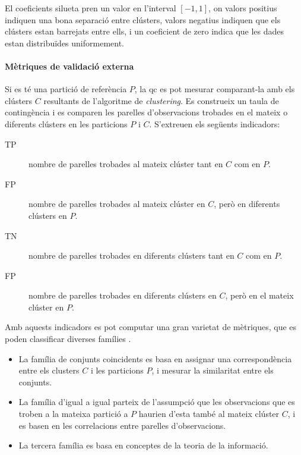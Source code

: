 \documentclass[CAT,BIB]{TFUOC}%
\begin{document}
            El coeficients silueta pren un valor en l'interval $[-1, 1]$,
            on valors positius indiquen una bona separació entre clústers,
            valors negatius indiquen que els clústers estan barrejats entre ells,
            i un coeficient de zero indica que les dades estan distribuïdes uniformement.

        \paragraph{Mètriques de validació externa}
            Si es té una partició de referència $P$,
            la \gls{qc} es pot mesurar comparant-la
            amb els clústers $C$ resultants de l'algoritme de \textit{clustering}.
            Es construeix un taula de contingència
            i es comparen les parelles d'observacions
            trobades en el mateix o diferents clústers
            en les particions $P$ i $C$.
            S'extreuen els següents indicadors:
            \begin{description}
                \item[TP]
                nombre de parelles trobades al mateix clúster
                tant en $C$ com en $P$.

                \item[FP] nombre de parelles trobades al mateix clúster en $C$,
                però en diferents clústers en $P$.

                \item[TN] nombre de parelles trobades en diferents clústers
                tant en $C$ com en $P$.

                \item[FP] nombre de parelles trobades en diferents clústers en $C$,
                però en el mateix clúster en $P$.
            \end{description}

            Amb aquests indicadors
            es pot computar una gran varietat de mètriques,
            que es poden classificar diverses famílies \citep{Palacio-Nino2019}.
            \begin{itemize}
                \item La família de conjunts coincidents
                es basa en assignar una correspondència
                entre els clusters $C$ i les particions $P$,
                i mesurar la similaritat entre els conjunts.

                \item La família d'igual a igual parteix de l'assumpció
                que les observacions que es troben a la mateixa partició a $P$
                haurien d'esta també al mateix clúster $C$,
                i es basen en les correlacions entre parelles d'observacions.

                \item La tercera família es basa
                en conceptes de la teoria de la informació.
            \end{itemize}
\end{document}

